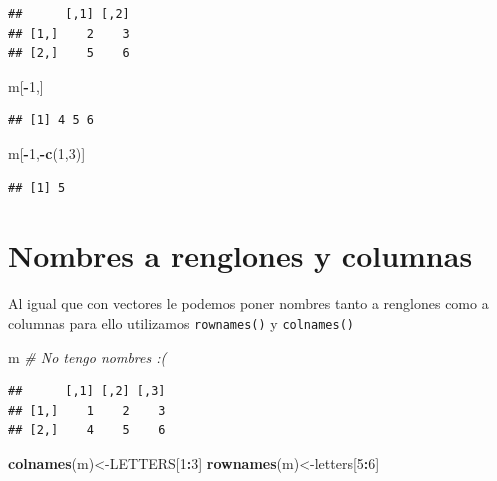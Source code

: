 \documentclass[
]{book}
\newenvironment{Shaded}{\begin{snugshade}}{\end{snugshade}}
\newcommand{\CommentTok}[1]{\textcolor[rgb]{0.56,0.35,0.01}{\textit{#1}}}
\newcommand{\DecValTok}[1]{\textcolor[rgb]{0.00,0.00,0.81}{#1}}
\newcommand{\FunctionTok}[1]{\textcolor[rgb]{0.13,0.29,0.53}{\textbf{#1}}}
\newcommand{\NormalTok}[1]{#1}
\newcommand{\OtherTok}[1]{\textcolor[rgb]{0.56,0.35,0.01}{#1}}
\newcommand{\SpecialCharTok}[1]{\textcolor[rgb]{0.81,0.36,0.00}{\textbf{#1}}}
\begin{document}
\begin{verbatim}
##      [,1] [,2]
## [1,]    2    3
## [2,]    5    6
\end{verbatim}

\begin{Shaded}
\begin{Highlighting}[]
\NormalTok{m[}\SpecialCharTok{{-}}\DecValTok{1}\NormalTok{,]}
\end{Highlighting}
\end{Shaded}

\begin{verbatim}
## [1] 4 5 6
\end{verbatim}

\begin{Shaded}
\begin{Highlighting}[]
\NormalTok{m[}\SpecialCharTok{{-}}\DecValTok{1}\NormalTok{,}\SpecialCharTok{{-}}\FunctionTok{c}\NormalTok{(}\DecValTok{1}\NormalTok{,}\DecValTok{3}\NormalTok{)]}
\end{Highlighting}
\end{Shaded}

\begin{verbatim}
## [1] 5
\end{verbatim}

\hypertarget{nombres-a-renglones-y-columnas}{%
\section{Nombres a renglones y columnas}\label{nombres-a-renglones-y-columnas}}

Al igual que con vectores le podemos poner nombres tanto a renglones como a columnas para ello utilizamos \texttt{rownames()} y \texttt{colnames()}

\begin{Shaded}
\begin{Highlighting}[]
\NormalTok{m   }\CommentTok{\# No tengo nombres :(}
\end{Highlighting}
\end{Shaded}

\begin{verbatim}
##      [,1] [,2] [,3]
## [1,]    1    2    3
## [2,]    4    5    6
\end{verbatim}

\begin{Shaded}
\begin{Highlighting}[]
\FunctionTok{colnames}\NormalTok{(m)}\OtherTok{\textless{}{-}}\NormalTok{LETTERS[}\DecValTok{1}\SpecialCharTok{:}\DecValTok{3}\NormalTok{]}
\FunctionTok{rownames}\NormalTok{(m)}\OtherTok{\textless{}{-}}\NormalTok{letters[}\DecValTok{5}\SpecialCharTok{:}\DecValTok{6}\NormalTok{]}
\end{Highlighting}
\end{Shaded}
\end{document}
